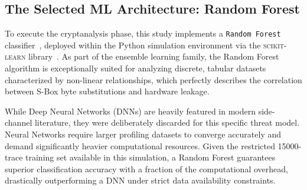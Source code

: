\documentclass[11pt,a4paper]{report}
\begin{document}
\subsection{The Selected ML Architecture: Random Forest}
To execute the cryptanalysis phase, this study implements a \texttt{Random Forest} classifier~\cite{RandomForest}, deployed within the Python simulation environment via the \textsc{scikit-learn} library~\cite{scikit-learn}. 
As part of the ensemble learning family, the Random Forest algorithm is exceptionally suited for analyzing discrete, tabular datasets characterized by non-linear relationships, which perfectly describes the correlation between S-Box byte substitutions and hardware leakage. 

While Deep Neural Networks (DNNs) are heavily featured in modern side-channel literature, they were deliberately discarded for this specific threat model. 
Neural Networks require larger profiling datasets to converge accurately and demand significantly heavier computational resources. 
Given the restricted 15000-trace training set available in this simulation, a Random Forest guarantees superior classification accuracy with a fraction of the computational overhead, drastically outperforming a DNN under strict data availability constraints.
\end{document}
